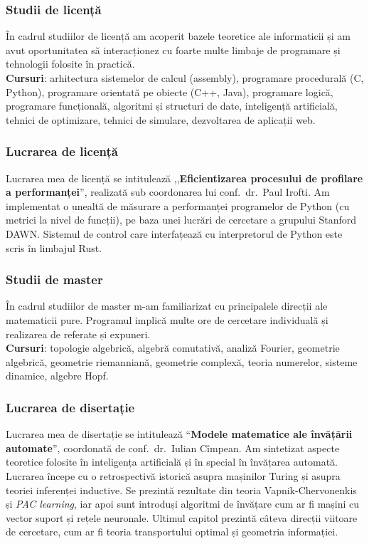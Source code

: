 \begin{frame}
\frametitle{Studii de licență}

În cadrul studiilor de licență am acoperit bazele teoretice ale informaticii și am avut oportunitatea să interacționez cu foarte multe limbaje de programare și tehnologii folosite în practică. \\[1em]

\textbf{Cursuri}: arhitectura sistemelor de calcul (assembly), programare procedurală (C, Python), programare orientată pe obiecte (C++, Java), programare logică, programare funcțională, algoritmi și structuri de date, inteligență artificială, tehnici de optimizare, tehnici de simulare, dezvoltarea de aplicații web.
\end{frame}

\begin{frame}
\frametitle{Lucrarea de licență}

Lucrarea mea de licență se intitulează ,,\textbf{Eficientizarea procesului de profilare a performanței}'', realizată sub coordonarea lui conf.~dr.~Paul Irofti. Am implementat o unealtă de măsurare a performanței programelor de Python (cu metrici la nivel de funcții), pe baza unei lucrări de cercetare a grupului Stanford DAWN. Sistemul de control care interfațează cu interpretorul de Python este scris în limbajul Rust.
\end{frame}

\begin{frame}
\frametitle{Studii de master}

În cadrul studiilor de master m-am familiarizat cu principalele direcții ale matematicii pure. Programul implică multe ore de cercetare individuală și realizarea de referate și expuneri. \\[1em]

\textbf{Cursuri}: topologie algebrică, algebră comutativă, analiză Fourier, geometrie algebrică, geometrie riemanniană, geometrie complexă, teoria numerelor, sisteme dinamice, algebre Hopf.
\end{frame}

\begin{frame}
\frametitle{Lucrarea de disertație}

Lucrarea mea de disertație se intitulează ``\textbf{Modele matematice ale învățării automate}'', coordonată de conf.~dr.~Iulian Cîmpean. Am sintetizat aspecte teoretice folosite în inteligența artificială și în special în învățarea automată. \\[1em]

Lucrarea începe cu o retrospectivă istorică asupra mașinilor Turing și asupra teoriei inferenței inductive. Se prezintă rezultate din teoria Vapnik-Chervonenkis și \emph{PAC learning}, iar apoi sunt introduși algoritmi de învățare cum ar fi mașini cu vector suport și rețele neuronale. Ultimul capitol prezintă câteva direcții viitoare de cercetare, cum ar fi teoria transportului optimal și geometria informației.
\end{frame}

